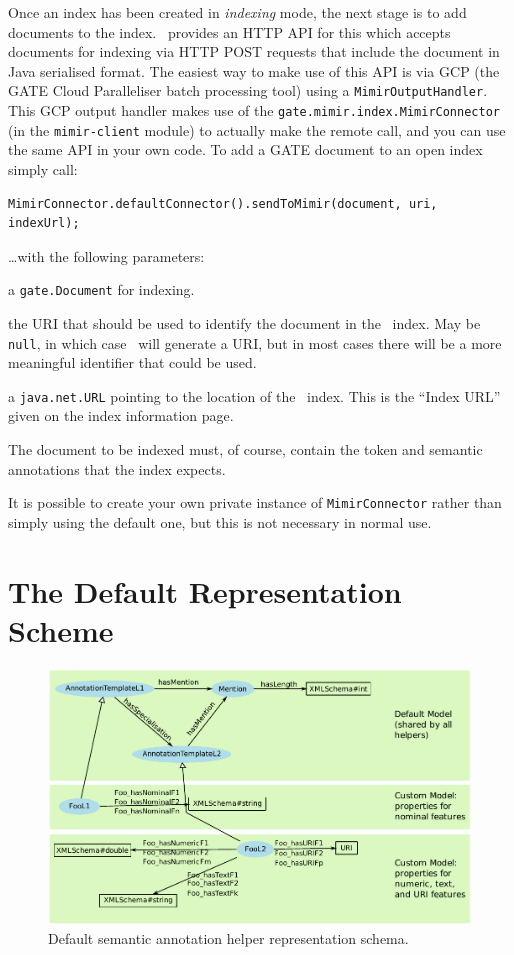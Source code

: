 Once an index has been created in {\em indexing} mode, the next stage is to add
documents to the index.  \Mimir\ provides an HTTP API for this which accepts
documents for indexing via HTTP POST requests that include the document in Java
serialised format.  The easiest way to make use of this API is via GCP (the
GATE Cloud Paralleliser batch processing tool) using a
\lstinline!MimirOutputHandler!.  This GCP output handler makes use of the
\lstinline!gate.mimir.index.MimirConnector! (in the {\tt mimir-client} module)
to actually make the remote call, and you can use the same API in your own
code.  To add a GATE document to an open index simply call:
\begin{lstlisting}[breaklines]
MimirConnector.defaultConnector().sendToMimir(document, uri, indexUrl);
\end{lstlisting}
%
\ldots{}with the following parameters:
\bde
\item[document] a \lstinline!gate.Document! for indexing.
\item[uri] the URI that should be used to identify the document in the \Mimir\
  index.  May be \lstinline!null!, in which case \Mimir\ will generate a URI,
  but in most cases there will be a more meaningful identifier that could be
  used.
\item[indexUrl] a \lstinline!java.net.URL! pointing to the location of the
  \Mimir\ index.  This is the ``Index URL'' given on the index information page.
\ede

The document to be indexed must, of course, contain the token and semantic
annotations that the index expects.

It is possible to create your own private instance of
\lstinline!MimirConnector! rather than simply using the default one, but this
is not necessary in normal use.

\section{The Default Representation Scheme}\label{sec:indexing:dsah-detail}

\begin{figure}[htb]
\begin{center}
\includegraphics[scale=0.66]{img/dsah-model}
\caption{Default semantic annotation helper representation schema.}
\label{fig:dsah-model}
\end{center}
\end{figure}

